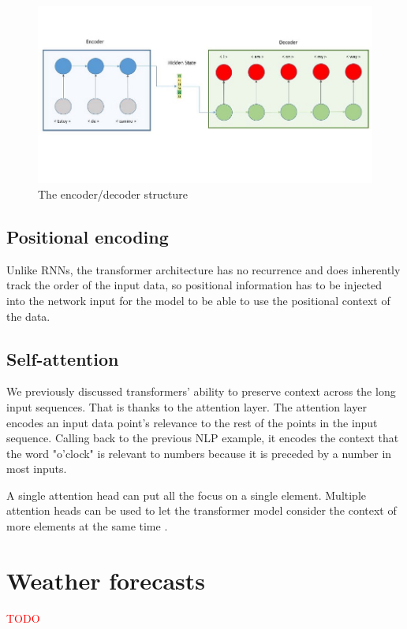 \begin{figure}[ht!]
    \centering
    \includegraphics[scale=0.5]{imgs/encoder_decoder.jpeg}
    \caption{The encoder/decoder structure \cite{nechu_what_2020}
    \label{fig:encoder_decoder}}
\end{figure}

\subsection{Positional encoding}
Unlike RNNs, the transformer architecture has no recurrence and does inherently track the order of the input data, so positional information has to be injected into the network input for the model to be able to use the positional context of the data.\cite{vaswani_attention_2017}

\subsection{Self-attention} We previously discussed transformers' ability to preserve context across the long input sequences. That is thanks to the attention layer. The attention layer encodes an input data point's relevance to the rest of the points in the input sequence. Calling back to the previous NLP example, it encodes the context that the word "o'clock" is relevant to numbers because it is preceded by a number in most inputs.
 
A single attention head can put all the focus on a single element. Multiple attention heads can be used to let the transformer model consider the context of more elements at the same time \cite{rohrer_transformers_2021}.

\section{Weather forecasts\label{cha:WRF}}
\textcolor{red}{TODO}
\cite{gueymard_global_2008, rognvaldsson_numerical_2013, jimenez_wrf-solar_2016}

